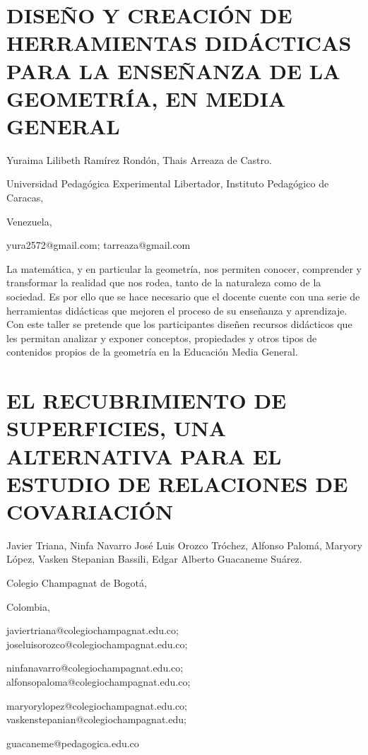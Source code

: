 \section{DISEÑO Y CREACIÓN DE HERRAMIENTAS DIDÁCTICAS PARA LA ENSEÑANZA DE
LA GEOMETRÍA, EN MEDIA GENERAL}

\begin{datos}

Yuraima Lilibeth Ramírez Rondón, Thais Arreaza de Castro.

Universidad Pedagógica Experimental Libertador, Instituto Pedagógico
de Caracas,

Venezuela,

yura2572@gmail.com; tarreaza@gmail.com 

\end{datos}

La matemática, y en particular la geometría, nos permiten conocer,
comprender y transformar la realidad que nos rodea, tanto de la naturaleza
como de la sociedad. Es por ello que se hace necesario que el docente
cuente con una serie de herramientas didácticas que mejoren el proceso
de su enseñanza y aprendizaje. Con este taller se pretende que los
participantes diseñen recursos didácticos que les permitan analizar
y exponer conceptos, propiedades y otros tipos de contenidos propios
de la geometría en la Educación Media General.


\section{EL RECUBRIMIENTO DE SUPERFICIES, UNA ALTERNATIVA PARA EL ESTUDIO
DE RELACIONES DE COVARIACIÓN }

\begin{datos}

Javier Triana, Ninfa Navarro José Luis Orozco Tróchez, Alfonso Palomá,
Maryory López, Vasken Stepanian Bassili, Edgar Alberto Guacaneme Suárez.

Colegio Champagnat de Bogotá,

Colombia,

javiertriana@colegiochampagnat.edu.co; joseluisorozco@colegiochampagnat.edu.co;

ninfanavarro@colegiochampagnat.edu.co; alfonsopaloma@colegiochampagnat.edu.co;

maryorylopez@colegiochampagnat.edu.co; vaskenstepanian@colegiochampagnat.edu;

guacaneme@pedagogica.edu.co

\end{datos}

